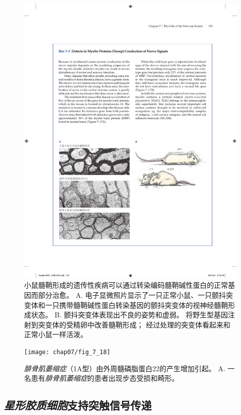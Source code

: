 \begin{figure}[htbp]
	\centering
	\includegraphics[width=1.0\linewidth]{chap07/fig_7_17}
	\caption{小鼠髓鞘形成的遗传性疾病可以通过转染编码髓鞘碱性蛋白的正常基因而部分治愈。
	A. 电子显微照片显示了一只正常小鼠、一只颤抖突变体和一只携带髓鞘碱性蛋白转染基因的颤抖突变体的视神经髓鞘形成状态。
	B. 颤抖突变体表现出不良的姿势和虚弱。
	将野生型基因注射到突变体的受精卵中改善髓鞘形成；
	经过处理的突变体看起来和正常小鼠一样活泼\cite{readhead1987expression}。}
	\label{fig:7_17}
\end{figure}


\begin{figure}[htbp]
	\centering
	\texttt{[image: chap07/fig\_7\_18]}
	\caption{\textit{腓骨肌萎缩症}（1A型）由外周髓磷脂蛋白22的产生增加引起。
	A. 一名患有\textit{腓骨肌萎缩症}的患者出现步态受损和畸形。}
	\label{fig:7_18}
\end{figure}




\subsection{\textit{星形胶质细胞}支持突触信号传递}

